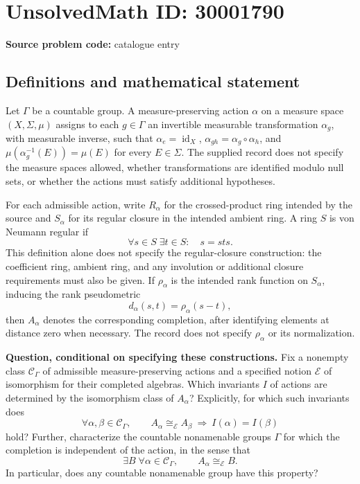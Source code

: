 \documentclass[11pt]{article}
\begin{document}
\section*{UnsolvedMath ID: 30001790}
\textbf{Source problem code:} catalogue entry
\subsection{Definitions and mathematical statement}
Let \(\Gamma\) be a countable group. A measure-preserving action \(\alpha\) on a measure space \((X,\Sigma,\mu)\) assigns to each \(g\in\Gamma\) an invertible measurable transformation \(\alpha_g\), with measurable inverse, such that \(\alpha_e=\operatorname{id}_X\), \(\alpha_{gh}=\alpha_g\circ\alpha_h\), and \(\mu(\alpha_g^{-1}(E))=\mu(E)\) for every \(E\in\Sigma\). The supplied record does not specify the measure spaces allowed, whether transformations are identified modulo null sets, or whether the actions must satisfy additional hypotheses.

For each admissible action, write \(R_\alpha\) for the crossed-product ring intended by the source and \(S_\alpha\) for its regular closure in the intended ambient ring. A ring \(S\) is von Neumann regular if
\[
\forall s\in S\;\exists t\in S:\quad s=sts.
\]
This definition alone does not specify the regular-closure construction: the coefficient ring, ambient ring, and any involution or additional closure requirements must also be given. If \(\rho_\alpha\) is the intended rank function on \(S_\alpha\), inducing the rank pseudometric
\[
d_\alpha(s,t)=\rho_\alpha(s-t),
\]
then \(A_\alpha\) denotes the corresponding completion, after identifying elements at distance zero when necessary. The record does not specify \(\rho_\alpha\) or its normalization.

\textbf{Question, conditional on specifying these constructions.} Fix a nonempty class \(\mathcal C_\Gamma\) of admissible measure-preserving actions and a specified notion \(\mathcal E\) of isomorphism for their completed algebras. Which invariants \(I\) of actions are determined by the isomorphism class of \(A_\alpha\)? Explicitly, for which such invariants does
\[
\forall\alpha,\beta\in\mathcal C_\Gamma,\qquad
A_\alpha\cong_{\mathcal E}A_\beta
\ \Longrightarrow\ I(\alpha)=I(\beta)
\]
hold? Further, characterize the countable nonamenable groups \(\Gamma\) for which the completion is independent of the action, in the sense that
\[
\exists B\;\forall\alpha\in\mathcal C_\Gamma,\qquad
A_\alpha\cong_{\mathcal E}B.
\]
In particular, does any countable nonamenable group have this property?
\end{document}
